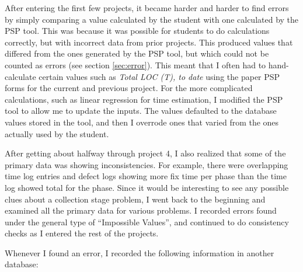 After entering the first few projects, it became harder and harder to find
errors by simply comparing a value calculated by the student with one
calculated by the PSP tool.  This was because it was possible for students
to do calculations correctly, but with incorrect data from prior projects.
This produced values that differed from the ones generated by the PSP tool,
but which could not be counted as errors (see section \ref{sec:error}).
This meant that I often had to hand-calculate certain values such as {\it
  Total LOC (T), to date} using the paper PSP forms for the current and
previous project.  For the more complicated calculations, such as linear
regression for time estimation, I modified the PSP tool to allow me to
update the inputs.  The values defaulted to the database values stored in
the tool, and then I overrode ones that varied from the ones actually used
by the student.

After getting about halfway through project 4, I also realized that some of
the primary data was showing inconsistencies.  For example, there were
overlapping time log entries and defect logs showing more fix time per
phase than the time log showed total for the phase.  Since it would be
interesting to see any possible clues about a collection stage problem, I
went back to the beginning and examined all the primary data for various
problems.  I recorded errors found under the general type of ``Impossible
Values'', and continued to do consistency checks as I entered the rest of
the projects.

Whenever I found an error, I recorded the following information in
another database:


